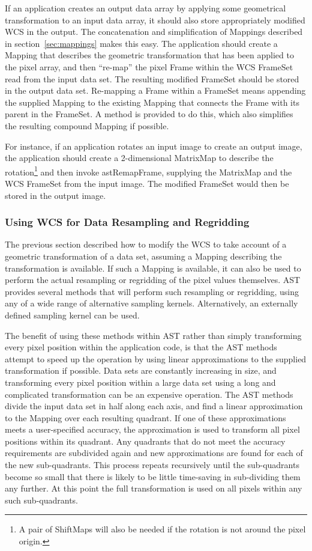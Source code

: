 \documentclass[final,authoryear,5p,times,twocolumn]{elsarticle}
\begin{document}
If an application creates an output data array by applying some geometrical
transformation to an input data array, it should also store appropriately
modified WCS in the output. The concatenation and simplification of
Mappings described in section~\ref{sec:mappings} makes this easy. The
application should create a Mapping that describes the geometric
transformation that has been applied to the pixel array, and then
``re-map'' the pixel Frame within the WCS FrameSet read from the input
data set. The resulting modified FrameSet should be stored in the output
data set. Re-mapping a Frame within a FrameSet means appending the
supplied Mapping to the existing Mapping that connects the Frame with its
parent in the FrameSet. A method is provided to do this, which also simplifies
the resulting compound Mapping if possible.

For instance, if an application rotates an input image to create an
output image, the application should create a 2-dimensional MatrixMap to
describe the rotation\footnote{A pair of ShiftMaps will also be needed if
the rotation is not around the pixel origin.} and then invoke
astRemapFrame, supplying the MatrixMap and the WCS FrameSet from the
input image. The modified FrameSet would then be stored in the output
image.

\subsubsection{Using WCS for Data Resampling and Regridding}
The previous section described how to modify the WCS to take account of a
geometric transformation of a data set, assuming a Mapping describing the
transformation is available. If such a Mapping is available, it can also
be used to perform the actual resampling or regridding of the pixel
values themselves. AST provides several methods that will perform such
resampling or regridding, using any of a wide range of alternative
sampling kernels. Alternatively, an externally defined sampling kernel
can be used.

The benefit of using these methods within AST rather than simply
transforming every pixel position within the application code, is that
the AST methods attempt to speed up the operation by using linear
approximations to the supplied transformation if possible. Data sets are
constantly increasing in size, and transforming every pixel position
within a large data set using a long and complicated transformation can
be an expensive operation. The AST methods divide the input data set in
half along each axis, and find a linear approximation to the Mapping
over each resulting quadrant. If one of these approximations meets a
user-specified accuracy, the approximation is used to transform all pixel positions
within its quadrant. Any quadrants that do not meet the accuracy
requirements are subdivided again and new approximations are found
for each of the new sub-quadrants. This process repeats recursively until
the sub-quadrants become so small that there is likely to be little
time-saving in sub-dividing them any further. At this point the full
transformation is used on all pixels within any such sub-quadrants.
\end{document}
